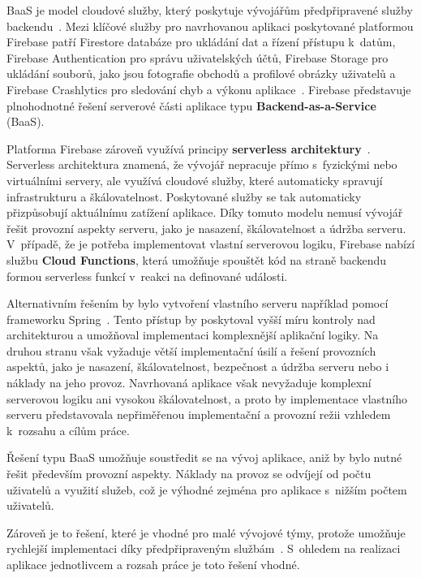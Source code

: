 BaaS je model cloudové služby, který poskytuje vývojářům předpřipravené služby backendu~\parencite{baas_definition}.
Mezi klíčové služby pro navrhovanou aplikaci poskytované platformou Firebase patří Firestore databáze pro ukládání dat a řízení přístupu k~datům, Firebase Authentication pro správu uživatelských účtů, Firebase Storage pro ukládání souborů, jako jsou fotografie obchodů a profilové obrázky uživatelů a Firebase Crashlytics pro sledování chyb a výkonu aplikace~\parencite{firebase_overview}.
Firebase představuje plnohodnotné řešení serverové části aplikace typu \textbf{Backend-as-a-Service} (BaaS).

Platforma Firebase zároveň využívá principy \textbf{serverless architektury}~\parencite{firebase_serverless}.
Serverless architektura znamená, že vývojář nepracuje přímo s~fyzickými nebo virtuálními servery, ale využívá cloudové služby, které automaticky spravují infrastrukturu a škálovatelnost.
Poskytované služby se tak automaticky přizpůsobují aktuálnímu zatížení aplikace.
Díky tomuto modelu nemusí vývojář řešit provozní aspekty serveru, jako je nasazení, škálovatelnost a údržba serveru.
V~případě, že je potřeba implementovat vlastní serverovou logiku, Firebase nabízí službu \textbf{Cloud Functions}, která umožňuje spouštět kód na straně backendu formou serverless funkcí v~reakci na definované události.

Alternativním řešením by bylo vytvoření vlastního serveru například pomocí frameworku Spring~\parencite{spring_framework}.
Tento přístup by poskytoval vyšší míru kontroly nad architekturou a umožňoval implementaci komplexnější aplikační logiky.
Na druhou stranu však vyžaduje větší implementační úsilí a řešení provozních aspektů, jako je nasazení, škálovatelnost, bezpečnost a údržba serveru nebo i náklady na jeho provoz.
Navrhovaná aplikace však nevyžaduje komplexní serverovou logiku ani vysokou škálovatelnost, a proto by implementace vlastního serveru představovala nepřiměřenou implementační a provozní režii vzhledem k~rozsahu a cílům práce.

Řešení typu BaaS umožňuje soustředit se na vývoj aplikace, aniž by bylo nutné řešit především provozní aspekty.
Náklady na provoz se odvíjejí od počtu uživatelů a využití služeb, což je výhodné zejména pro aplikace s~nižším počtem uživatelů.

Zároveň je to řešení, které je vhodné pro malé vývojové týmy, protože umožňuje rychlejší implementaci díky předpřipraveným službám~\parencite{firebase_benefits}.
S~ohledem na realizaci aplikace jednotlivcem a rozsah práce je toto řešení vhodné.

